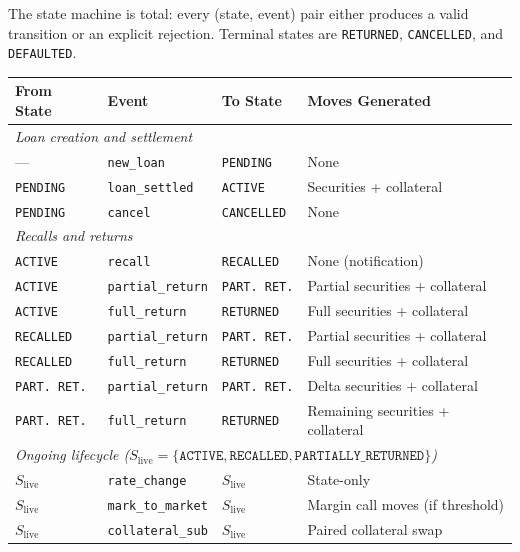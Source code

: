\documentclass[11pt,a4paper]{article}
\begin{document}
The state machine is total: every (state, event) pair either produces a valid transition or an explicit rejection. Terminal states are \texttt{RETURNED}, \texttt{CANCELLED}, and \texttt{DEFAULTED}.

\begin{center}
\small
\begin{tabular}{l l l l}
\toprule
\textbf{From State} & \textbf{Event} & \textbf{To State} & \textbf{Moves Generated} \\
\midrule
\multicolumn{4}{l}{\textit{Loan creation and settlement}} \\
--- & \texttt{new\_loan} & \texttt{PENDING} & None \\
\texttt{PENDING} & \texttt{loan\_settled} & \texttt{ACTIVE} & Securities + collateral \\
\texttt{PENDING} & \texttt{cancel} & \texttt{CANCELLED} & None \\
\midrule
\multicolumn{4}{l}{\textit{Recalls and returns}} \\
\texttt{ACTIVE} & \texttt{recall} & \texttt{RECALLED} & None (notification) \\
\texttt{ACTIVE} & \texttt{partial\_return} & \texttt{PART.\ RET.} & Partial securities + collateral \\
\texttt{ACTIVE} & \texttt{full\_return} & \texttt{RETURNED} & Full securities + collateral \\
\texttt{RECALLED} & \texttt{partial\_return} & \texttt{PART.\ RET.} & Partial securities + collateral \\
\texttt{RECALLED} & \texttt{full\_return} & \texttt{RETURNED} & Full securities + collateral \\
\texttt{PART.\ RET.} & \texttt{partial\_return} & \texttt{PART.\ RET.} & Delta securities + collateral \\
\texttt{PART.\ RET.} & \texttt{full\_return} & \texttt{RETURNED} & Remaining securities + collateral \\
\midrule
\multicolumn{4}{l}{\textit{Ongoing lifecycle ($S_{\mathrm{live}} = \{\texttt{ACTIVE}, \texttt{RECALLED}, \texttt{PARTIALLY\_RETURNED}\}$)}} \\
$S_{\mathrm{live}}$ & \texttt{rate\_change} & $S_{\mathrm{live}}$ & State-only \\
$S_{\mathrm{live}}$ & \texttt{mark\_to\_market} & $S_{\mathrm{live}}$ & Margin call moves (if threshold) \\
$S_{\mathrm{live}}$ & \texttt{collateral\_sub} & $S_{\mathrm{live}}$ & Paired collateral swap \\

\end{tabular}
\end{center}
\end{document}
